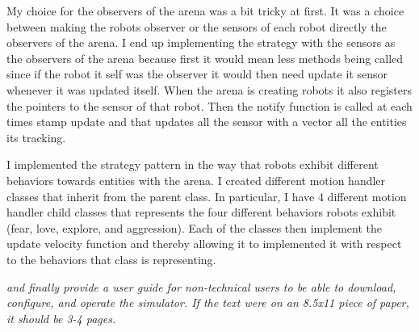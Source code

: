 My choice for the observers of the arena was a bit tricky at first. It was a choice between making the robots observer or the sensors of each robot directly the observers of the arena. I end up implementing the strategy with the sensors as the observers of the arena because first it would mean less methods being called since if the robot it self was the observer it would then need update it sensor whenever it was updated itself. When the arena is creating robots it also registers the pointers to the sensor of that robot. Then the notify function is called at each times stamp update and that updates all the sensor with a vector all the entities its tracking.

I implemented the strategy pattern in the way that robots exhibit different behaviors towards entities with the arena. I created different motion handler classes that inherit from the parent class. In particular, I have 4 different motion handler child classes that represents the four different behaviors robots exhibit (fear, love, explore, and aggression). Each of the classes then implement the update velocity function and thereby allowing it to implemented it with respect to the behaviors that class is representing.


\begin{DoxyItemize}
\item {\itshape and finally provide a user guide for non-\/technical users to be able to download, configure, and operate the simulator. If the text were on an 8.\+5x11 piece of paper, it should be 3-\/4 pages.} 
\end{DoxyItemize}
